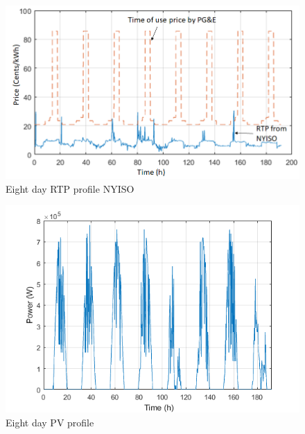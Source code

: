 \begin{figure}[!ht]
    \centering
    \includegraphics[width = \linewidth]{figs/A8/Price_profiles.png}
    \caption{Eight day RTP profile NYISO}
    \label{fig:RTP_PROFILE_8}
\end{figure}



\begin{figure}[!ht]
    \centering
    \includegraphics[width = \linewidth]{figs/A8/PV_PROFILE.png}
    \caption{Eight day PV profile}
    \label{fig:PV_PROFILE_8}
\end{figure}


